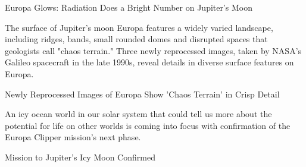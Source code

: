 \documentclass[a4paper,11pt]{article}
\begin{document}
\begin{docenv}
{Europa Glows: Radiation Does a Bright Number on Jupiter's Moon

The surface of Jupiter's moon Europa features a widely varied landscape, including ridges, bands, small rounded domes and disrupted spaces that geologists call "chaos terrain." Three newly reprocessed images, taken by NASA's Galileo spacecraft in the late 1990s, reveal details in diverse surface features on Europa.

Newly Reprocessed Images of Europa Show 'Chaos Terrain' in Crisp Detail

An icy ocean world in our solar system that could tell us more about the potential for life on other worlds is coming into focus with confirmation of the Europa Clipper mission's next phase. 

Mission to Jupiter's Icy Moon Confirmed}
\end{docenv}
\end{document}
